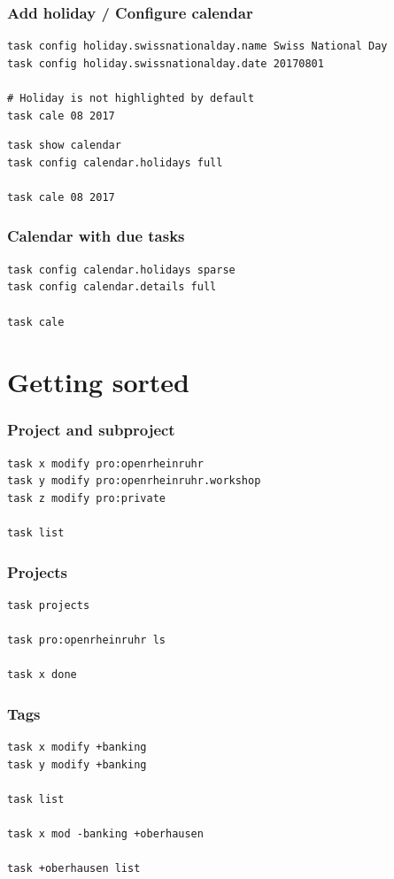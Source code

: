 \documentclass[t,handout]{beamer}
\begin{document}
\begin{frame}[fragile]\frametitle{Add holiday / Configure calendar}
    \vfill
    \begin{lstlisting}
task config holiday.swissnationalday.name Swiss National Day
task config holiday.swissnationalday.date 20170801

# Holiday is not highlighted by default
task cale 08 2017\end{lstlisting}

    \begin{lstlisting}
task show calendar
task config calendar.holidays full

task cale 08 2017\end{lstlisting}
\end{frame}

\begin{frame}[fragile]\frametitle{Calendar with due tasks}
    \vfill
    \begin{lstlisting}
task config calendar.holidays sparse
task config calendar.details full

task cale\end{lstlisting}
\end{frame}

\section{Getting sorted}

\begin{frame}[fragile]\frametitle{Project and subproject}
    \vfill
    \begin{lstlisting}
task x modify pro:openrheinruhr
task y modify pro:openrheinruhr.workshop
task z modify pro:private

task list\end{lstlisting}
\end{frame}

\begin{frame}[fragile]\frametitle{Projects}
    \vfill
    \begin{lstlisting}
task projects

task pro:openrheinruhr ls

task x done\end{lstlisting}
\end{frame}

\begin{frame}[fragile]\frametitle{Tags}
    \vfill
    \begin{lstlisting}
task x modify +banking
task y modify +banking

task list

task x mod -banking +oberhausen

task +oberhausen list\end{lstlisting}
\end{frame}
\end{document}
